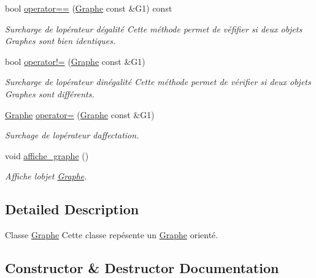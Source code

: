 \begin{DoxyCompactItemize}
$$bool \hyperlink{classGraphe_af1333b4eb62b330dd004764342622e52}{operator==} (\hyperlink{classGraphe}{Graphe} const \&G1) const
\begin{DoxyCompactList}\small\item\em Surcharge de l\textquotesingle{}op\'{e}rateur d\textquotesingle{}\'{e}galit\'{e} Cette m\'{e}thode permet de v\'{e}fifier si deux objets Graphes sont bien identiques. \end{DoxyCompactList}\item 
bool \hyperlink{classGraphe_ae75822e0de166927c13e63bd8e738491}{operator!=} (\hyperlink{classGraphe}{Graphe} const \&G1)
\begin{DoxyCompactList}\small\item\em Surcharge de l\textquotesingle{}op\'{e}rateur d\textquotesingle{}in\'{e}galit\'{e} Cette m\'{e}thode permet de v\'{e}rifier si deux objets Graphes sont diff\'{e}rents. \end{DoxyCompactList}\item 
\hyperlink{classGraphe}{Graphe} \hyperlink{classGraphe_ae72a0836b560b51da3d82d3d4ff3a7c0}{operator=} (\hyperlink{classGraphe}{Graphe} const \&G1)
\begin{DoxyCompactList}\small\item\em Surchage de l\textquotesingle{}op\'{e}rateur d\textquotesingle{}affectation. \end{DoxyCompactList}\item 
\mbox{\label{classGraphe_a6f7473b9ed89786ea71dfd2c6ee4b0c2}} 
void \hyperlink{classGraphe_a6f7473b9ed89786ea71dfd2c6ee4b0c2}{affiche\+\_\+graphe} ()
\begin{DoxyCompactList}\small\item\em Affiche l\textquotesingle{}objet \hyperlink{classGraphe}{Graphe}. \end{DoxyCompactList}\end{DoxyCompactItemize}


\subsection{Detailed Description}
Classe \hyperlink{classGraphe}{Graphe} Cette classe rep\'{e}sente un \hyperlink{classGraphe}{Graphe} orient\'{e}. 

\subsection{Constructor \& Destructor Documentation}
\mbox{\label{classGraphe_ad2f9489948e74e09a50206604e3094a6}} 
